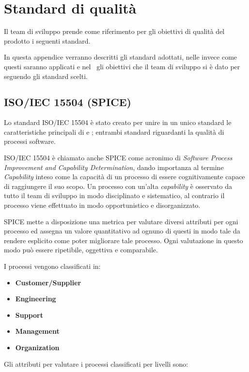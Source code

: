 \newpage
\section{Standard di qualità}
Il team di sviluppo prende come riferimento per gli obiettivi di qualità del prodotto i seguenti standard.

In questa appendice verranno descritti gli standard adottati, nelle \NdP\D invece come questi saranno applicati e nel \PdQ~gli obiettivi che il team di sviluppo si è dato per seguendo gli standard scelti.

\subsection{ISO/IEC 15504 (SPICE)}
Lo standard ISO/IEC 15504 è stato creato per unire in un unico standard le caratteristiche principali di  e ; entrambi standard riguardanti la qualità di processi software.

ISO/IEC 15504 è chiamato anche SPICE come acronimo di \textit{Software Process Improvement and Capability Determination}, dando importanza al termine \textit{Capability} inteso come la capacità di un processo di essere cognitivamente capace di raggiungere il suo scopo. Un processo con un'alta \textit{capability} è osservato da tutto il team di sviluppo in modo disciplinato e sistematico, al contrario il processo viene effettuato in modo opportunistico e disorganizzato.

SPICE mette a disposizione una metrica per valutare diversi attributi per ogni processo ed assegna un valore quantitativo ad ognuno di questi in modo tale da rendere esplicito come poter migliorare tale processo. Ogni valutazione in questo modo può essere ripetibile, oggettiva e comparabile.

I processi vengono classificati in:

\begin{itemize}
	\item \textbf{Customer/Supplier}
	\item \textbf{Engineering}
	\item \textbf{Support}
	\item \textbf{Management}
	\item \textbf{Organization}
\end{itemize}

Gli attributi per valutare i processi classificati per livelli sono:

